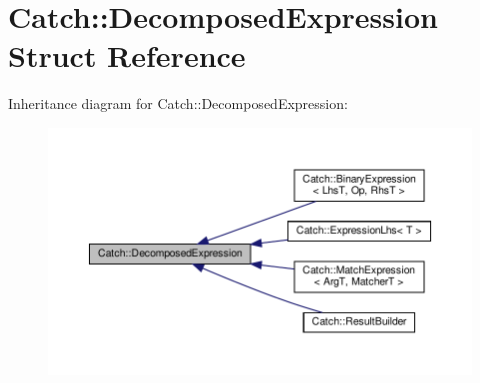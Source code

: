 \hypertarget{structCatch_1_1DecomposedExpression}{}\section{Catch\+:\+:Decomposed\+Expression Struct Reference}
\label{structCatch_1_1DecomposedExpression}


Inheritance diagram for Catch\+:\+:Decomposed\+Expression\+:
\nopagebreak
\begin{figure}[H]
\begin{center}
\leavevmode
\includegraphics[width=350pt]{structCatch_1_1DecomposedExpression__inherit__graph}
\end{center}
\end{figure}
